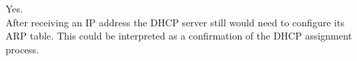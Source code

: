 Yes. \\
After receiving an IP address the DHCP server still would need to configure its ARP table. This could be interpreted as a confirmation of the DHCP assignment process.
